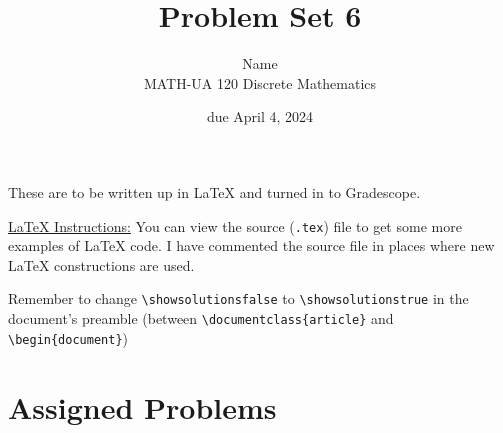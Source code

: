 \documentclass{article}
\title{Problem Set 6}
\author{%
    Name
\\  MATH-UA 120 Discrete Mathematics
}
\date{due April 4, 2024}
\newif\ifshowsolutions
\newcommand{\danger}{\marginpar[\hfill\dbend]{\dbend\hfill}}
\theoremstyle{definition}
\begin{document}
\maketitle



These are to be written up in \LaTeX{} and turned in to Gradescope.



\ifshowsolutions
    \SetupExSheets{solution/print=true}
\else
    \danger
 \underline{ \LaTeX{}  Instructions:}  You can view the source (\texttt{.tex}) file to get some more examples of \LaTeX{} code.  I have commented the source file in places where new \LaTeX{} constructions are used.
  
  Remember to change \verb|\showsolutionsfalse| to \verb|\showsolutionstrue|
    in the document's preamble 
    (between \verb|\documentclass{article}| and \verb|\begin{document}|)
\fi

\section*{Assigned Problems}
\end{document}
